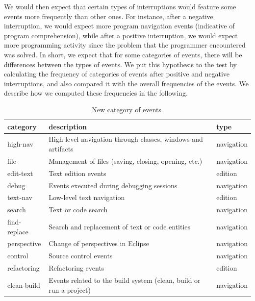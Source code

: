 \documentclass[times]{smrauth}
\begin{document}
We would then expect that certain types of interruptions would feature some events more frequently than other ones. For instance, after a negative interruption, we would expect more program navigation events (indicative of program comprehension), while after a positive interruption, we would expect more programming activity since the problem that the programmer encountered was solved. In short, we expect that for some categories of events, there will be differences between the types of events. We put this hypothesis to the test by calculating the frequency of categories of events after positive and negative interruptions, and also compared it with the overall frequencies of the events. We describe how we computed these frequencies in the following.

\begin{table}[ht!]
	\small
	\renewcommand{\arraystretch}{1.3}
	\caption{New category of events. }
	\label{tbl:new_events_udc}
	\centering
	\begin{tabular}{|p{2.5cm}|p{9 cm}| p{2cm} |}
		\hline 
		category & description & type \\  
		\hline 
		\hline 
		high-nav & High-level navigation through classes, windows and artifacts & navigation \\
		file & Management of files (saving, closing, opening, etc.) & navigation\\
		edit-text & Text edition events & edition \\
		debug & Events executed during debugging sessions & navigation \\
		text-nav & Low-level text navigation & edition \\
		search & Text or code search & navigation \\
		find-replace & Search and replacement of text or code entities & navigation\\
		perspective & Change of perspectives in Eclipse & navigation  \\
		control & Source control events & navigation \\
		refactoring & Refactoring events & edition \\
		clean-build &  Events related to the build system (clean, build or run a project)  & navigation \\
		\hline
	\end{tabular}
\end{table}
\end{document}
